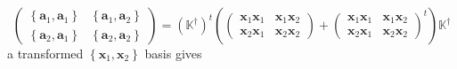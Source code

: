 \documentclass[aps, preprint]{revtex4}
\begin{document}
\begin{equation}\left (\begin{array}{cc}\left \{\mathbf{a}_{1} ,\mathbf{a}_{1}\right \} & \left \{\mathbf{a}_{1} ,\mathbf{a}_{2}\right \} \\
\left \{\mathbf{a}_{2} ,\mathbf{a}_{1}\right \} & \left \{\mathbf{a}_{2} ,\mathbf{a}_{2}\right \}\end{array}\right ) =\left (\mathbb{K}^{ \dag }\right )^{t} \left (\left (\begin{array}{cc}\mathbf{x}_{1} \mathbf{x}_{1} & \mathbf{x}_{1} \mathbf{x}_{2} \\
\mathbf{x}_{2} \mathbf{x}_{1} & \mathbf{x}_{2} \mathbf{x}_{2}\end{array}\right ) +\left (\begin{array}{cc}\mathbf{x}_{1} \mathbf{x}_{1} & \mathbf{x}_{1} \mathbf{x}_{2} \\
\mathbf{x}_{2} \mathbf{x}_{1} & \mathbf{x}_{2} \mathbf{x}_{2}\end{array}\right )^{t}\right ) \mathbb{K}^{ \dag }
\end{equation}a transformed $\left \{\mathbf{x}_{1} ,\mathbf{x}_{2}\right \}$ basis gives
\end{document}
